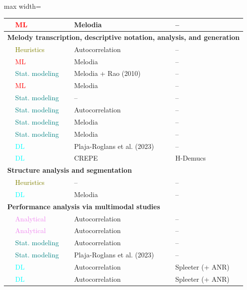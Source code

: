 \begin{table}[p]
\begin{adjustbox}{max width=\textwidth}
\begin{tabular}{l p{2.2cm} p{3.8cm} p{3.1cm}}
\citep{koduri-intonation} & \textcolor{red}{ML} & Melodia & -- \\
\midrule
\multicolumn{4}{l}{\textbf{Melody transcription, descriptive notation, analysis, and generation}} \\
\midrule
\citep{miryala-transcription} & \textcolor{olive}{Heuristics} & Autocorrelation & -- \\
\citep{gulati-landmark} & \textcolor{red}{ML} & Melodia  & -- \\
\citep{gulati-evaluation} & \textcolor{teal}{Stat. modeling} & Melodia + Rao (2010) & -- \\
\citep{ganguli-structures} & \textcolor{red}{ML} & Melodia & -- \\
\citep{senturk-svaras} & \textcolor{teal}{Stat. modeling} & -- & -- \\
\citep{ranjani-quantized} & \textcolor{teal}{Stat. modeling} & Autocorrelation & -- \\
\citep{dhara-transciption} & \textcolor{teal}{Stat. modeling} & Melodia & -- \\
\citep{ranjani-compact} & \textcolor{teal}{Stat. modeling} & Melodia & -- \\
\citep{nuttall-svara} & \textcolor{cyan}{DL} & Plaja-Roglans et al. (2023) & -- \\
\citep{shikarpur-hierarchical} & \textcolor{cyan}{DL} & CREPE & H-Demucs \\
\midrule
\multicolumn{4}{l}{\textbf{Structure analysis and segmentation}} \\
\midrule
\citep{verma-structural} & \textcolor{olive}{Heuristics} & -- & -- \\
\citep{ranjani-structural} & \textcolor{cyan}{DL} & Melodia & -- \\
\midrule
\multicolumn{4}{l}{\textbf{Performance analysis via multimodal studies}} \\
\midrule
\citep{pearson-gesture_sonic} & \textcolor{violet}{Analytical} & Autocorrelation & -- \\
\citep{pearson-coarticulation} & \textcolor{violet}{Analytical} & Autocorrelation & -- \\
\citep{pearson-gesture_coupling} & \textcolor{teal}{Stat. modeling} & Autocorrelation & -- \\
\citep{pearson-landscapes} & \textcolor{teal}{Stat. modeling} & Plaja-Roglans et al. (2023) & -- \\
\citep{nadkarni-exploring} & \textcolor{cyan}{DL} & Autocorrelation & Spleeter (+ ANR) \\
\citep{nadkarni-gesture_motifs} & \textcolor{cyan}{DL} & Autocorrelation & Spleeter (+ ANR) \\
\bottomrule
\end{tabular}
\end{adjustbox}
\vfill\clearpage
\end{table}